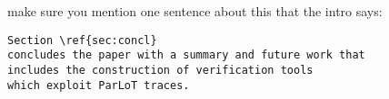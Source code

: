 
make sure you mention one sentence about  this that the intro
says:

\begin{verbatim}
Section \ref{sec:concl}
concludes the paper with a summary and future work that
includes the construction of verification tools
which exploit ParLoT traces.
\end{verbatim}
